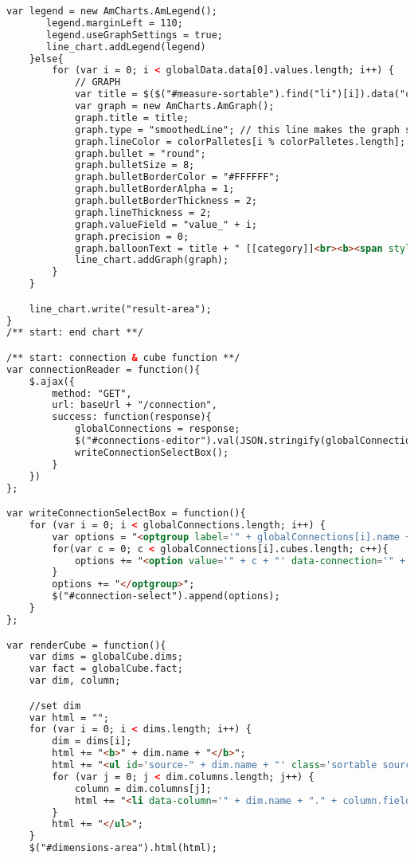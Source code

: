 \begin{lstlisting}[language=HTML,basicstyle=\tiny,caption=script.js]
        var legend = new AmCharts.AmLegend();
       legend.marginLeft = 110;
       legend.useGraphSettings = true;
       line_chart.addLegend(legend)
    }else{
        for (var i = 0; i < globalData.data[0].values.length; i++) {
            // GRAPH
            var title = $($("#measure-sortable").find("li")[i]).data("column");
            var graph = new AmCharts.AmGraph();
            graph.title = title;
            graph.type = "smoothedLine"; // this line makes the graph smoothed line.
            graph.lineColor = colorPalletes[i % colorPalletes.length];
            graph.bullet = "round";
            graph.bulletSize = 8;
            graph.bulletBorderColor = "#FFFFFF";
            graph.bulletBorderAlpha = 1;
            graph.bulletBorderThickness = 2;
            graph.lineThickness = 2;
            graph.valueField = "value_" + i;
            graph.precision = 0;
            graph.balloonText = title + " [[category]]<br><b><span style='font-size:14px;'>[[value]]</span></b>";
            line_chart.addGraph(graph);
        }
    }

    line_chart.write("result-area");
}
/** start: end chart **/

/** start: connection & cube function **/
var connectionReader = function(){
    $.ajax({
        method: "GET",
        url: baseUrl + "/connection",
        success: function(response){
            globalConnections = response;
            $("#connections-editor").val(JSON.stringify(globalConnections, null, 4));
            writeConnectionSelectBox();
        }
    })
};

var writeConnectionSelectBox = function(){
    for (var i = 0; i < globalConnections.length; i++) {
        var options = "<optgroup label='" + globalConnections[i].name + "'>";
        for(var c = 0; c < globalConnections[i].cubes.length; c++){
            options += "<option value='" + c + "' data-connection='" + i + "' data-cube='" + c + "'>" + globalConnections[i].cubes[c].name + "</option>";
        }
        options += "</optgroup>";
        $("#connection-select").append(options);
    }
};

var renderCube = function(){
    var dims = globalCube.dims;
    var fact = globalCube.fact;
    var dim, column;

    //set dim
    var html = "";
    for (var i = 0; i < dims.length; i++) {
        dim = dims[i];
        html += "<b>" + dim.name + "</b>";
        html += "<ul id='source-" + dim.name + "' class='sortable source-sortable'>";
        for (var j = 0; j < dim.columns.length; j++) {
            column = dim.columns[j];
            html += "<li data-column='" + dim.name + "." + column.field + "'>" + column.field + "</li>";
        }
        html += "</ul>";
    }
    $("#dimensions-area").html(html);


\end{lstlisting}
